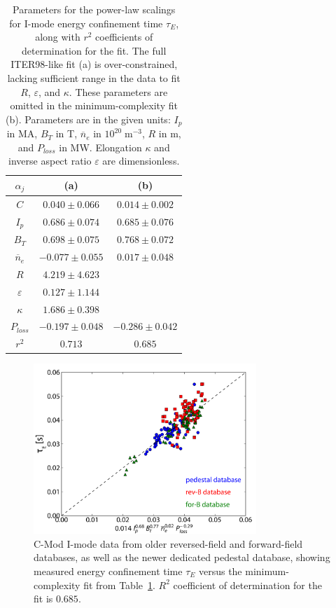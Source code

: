 \documentclass[12pt]{iopart}
\begin{document}
\begin{table}[ht]
 \centering
 \begin{tabular}{ccc}
  \hline
  $\alpha_j$ & (a) & (b)\\
  \hline
  $C$ & $0.040 \pm 0.066$ & $0.014 \pm 0.002$ \\
 $I_p$ & $0.686 \pm 0.074$ & $0.685 \pm 0.076$ \\
  $B_T$ & $0.698 \pm 0.075$ & $0.768 \pm 0.072$ \\
  $\overline{n}_e$ & $-0.077 \pm 0.055$ & $0.017 \pm 0.048$ \\
  $R$ & $4.219 \pm 4.623$ & \\
  $\varepsilon$ & $0.127 \pm 1.144$ & \\
  $\kappa$ & $1.686 \pm 0.398$ & \\
  $P_{loss}$ & $-0.197 \pm 0.048$ & $-0.286 \pm 0.042$ \\
  $r^2$ & $0.713$ & $0.685$ \\
  \hline
 \end{tabular}
 \caption{Parameters for the power-law scalings for I-mode energy confinement time $\tau_E$, along with $r^2$ coefficients of determination for the fit.  The full ITER98-like fit (a) is over-constrained, lacking sufficient range in the data to fit $R$, $\varepsilon$, and $\kappa$.  These parameters are omitted in the minimum-complexity fit (b).  Parameters are in the given units: $I_p$ in MA, $B_T$ in T, $\overline{n}_e$ in $10^{20}\;\mbox{m}^{-3}$, $R$ in m, and $P_{loss}$ in MW.  Elongation $\kappa$ and inverse aspect ratio $\varepsilon$ are dimensionless.}
 \label{tab:fits}
\end{table}

\begin{figure}[ht]
 \centering
 \includegraphics[width=0.75\textwidth]{tauE_3_Ploss_sep.pdf}
 \caption{C-Mod I-mode data from older reversed-field and forward-field databases, as well as the newer dedicated pedestal database, showing measured energy confinement time $\tau_E$ versus the minimum-complexity fit from Table~\ref{tab:fits}.  $R^2$ coefficient of determination for the fit is $0.685$.}
 \label{fig:taue_cmod}
\end{figure}
\end{document}
